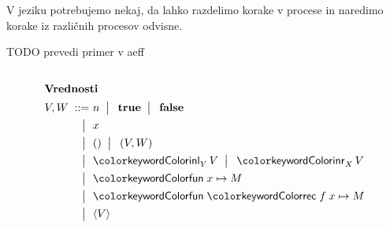 \documentclass{beamer}
\theoremstyle{definition} %
\theoremstyle{plain} %
\begin{document}
	\begin{frame}[fragile]{\aeff{}}
		V jeziku potrebujemo nekaj, da lahko razdelimo korake v procese in naredimo korake iz različnih procesov odvisne.
		
		
		TODO prevedi primer v aeff
		
		
	\end{frame}

	\begin{frame}{\lae{}}
		
		\begin{columns}[T]
			\begin{column}{0.27\textwidth}
				\begin{figure}[hp]
					\parbox{\textwidth}{
						\centering
						\tiny
						\begin{align*}
						\intertext{\textbf{Vrednosti}}
						V, W
						\bnfis& n \bnfor\! \true \bnfor\! \false        \\
						\bnfor& x                                       \\
						\bnfor& \tmunit \bnfor\! \tmpair{V}{W}          \\
						\bnfor& \tminl[Y]{V} \bnfor\! \tminr[X]{V}      \\
						\bnfor& \tmfun{x}{M}                        \\
						\bnfor& \tmfunrec{f}{x}{M}                   \\
						\bnfor& \tmpromise V                           
						\end{align*}
					} 
				\end{figure}
			\end{column}
		

\end{columns}
\end{frame}
\end{document}
